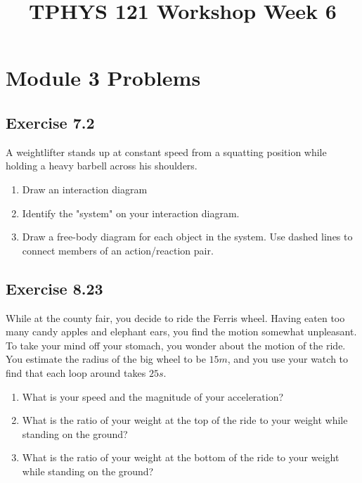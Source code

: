 \documentclass[11pt]{article}
\title{TPHYS 121 Workshop Week 6}
\author{}
\date{\vspace{-15ex}}
\newenvironment{exercise}{
    \begin{mdframed}[style=problemstyle]\textcolor{black}{}
}{
    \end{mdframed}
}
\begin{document}
\maketitle

\section*{Module 3 Problems}

\subsection*{Exercise 7.2}
\begin{exercise}
    A weightlifter stands up at constant speed from a squatting position while
    holding a heavy barbell across his shoulders.
    \begin{enumerate}[label=\alph*]
        \item Draw an interaction diagram
        \item Identify the "system" on your interaction diagram.
        \item Draw a free-body diagram for each object in the system. Use
            dashed lines to connect members of an action/reaction pair.
    \end{enumerate}
\end{exercise}

\subsection*{Exercise 8.23}
\begin{exercise}
    While at the county fair, you decide to ride the Ferris wheel. 
    Having eaten too many candy apples and elephant ears, you find the 
    motion somewhat unpleasant. To take your mind off your stomach, you 
    wonder about the motion of the ride. You estimate the radius of the 
    big wheel to be $15m$, and you use your watch to find that each loop 
    around takes $25s$.
    \begin{enumerate}[label=\alph*]
        \item What is your speed and the magnitude of your acceleration?
        \item What is the ratio of your weight at the top of the ride to 
            your weight while standing on the ground?
        \item What is the ratio of your weight at the bottom of the ride 
            to your weight while standing on the ground?
    \end{enumerate}
\end{exercise}
\end{document}
